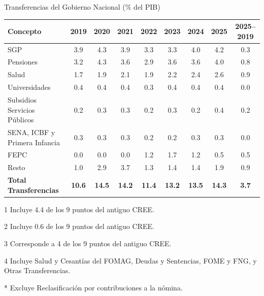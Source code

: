 \begin{frame}{Transferencias del Gobierno Nacional (\% del PIB)}
\footnotesize
\begin{threeparttable}
\setlength{\tabcolsep}{3.5pt}
\begin{tabular}{l*{7}{S}|S}
\textbf{Concepto} & \textbf{2019} & \textbf{2020} & \textbf{2021} & \textbf{2022} & \textbf{2023} & \textbf{2024} & \textbf{2025} & \textbf{2025--2019} \\ \hline
SGP                              & 3.9 & 4.3 & 3.9 & 3.3 & 3.3 & 4.0 & 4.2 & 0.3 \\
Pensiones                        & 3.2 & 4.3 & 3.6 & 2.9 & 3.6 & 3.6 & 4.0 & 0.8 \\
Salud                   & 1.7 & 1.9 & 2.1 & 1.9 & 2.2 & 2.4 & 2.6 & 0.9 \\
Universidades           & 0.4 & 0.4 & 0.4 & 0.3 & 0.4 & 0.4 & 0.4 & 0.0 \\
Subsidios Servicios Públicos     & 0.2 & 0.3 & 0.3 & 0.2 & 0.3 & 0.2 & 0.4 & 0.2 \\
SENA, ICBF y Primera Infancia & 0.3 & 0.3 & 0.3 & 0.2 & 0.2 & 0.3 & 0.3 & 0.0 \\
FEPC                             & 0.0 & 0.0 & 0.0 & 1.2 & 1.7 & 1.2 & 0.5 & 0.5 \\
Resto                   & 1.0 & 2.9 & 3.7 & 1.3 & 1.4 & 1.4 & 1.9 & 0.9 \\ \hline
\textbf{Total Transferencias\tnote{*}} & \textbf{10.6} & \textbf{14.5} & \textbf{14.2} & \textbf{11.4} & \textbf{13.2} & \textbf{13.5} & \textbf{14.3} & \textbf{3.7} \\ \hline
\end{tabular}
\begin{tablenotes}[flushleft]
\tiny
\item[1] Incluye 4.4 de los 9 puntos del antiguo CREE.
\item[2] Incluye 0.6 de los 9 puntos del antiguo CREE.
\item[3] Corresponde a 4 de los 9 puntos del antiguo CREE.
\item[4] Incluye Salud y Cesantías del FOMAG, Deudas y Sentencias, FOME y FNG, y Otras Transferencias.
\item[*] Excluye Reclasificación por contribuciones a la nómina.
\end{tablenotes}
\end{threeparttable}
\end{frame}
